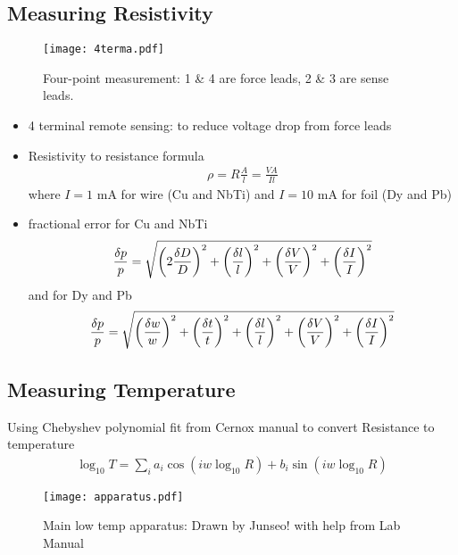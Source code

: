 \documentclass{article}
\begin{document}
\subsection{Measuring Resistivity}
\begin{figure}[ht]
    \centering
    \texttt{[image: 4terma.pdf]}
    \caption{Four-point measurement: 1 \& 4 are force leads, 2 \& 3 are sense leads.}
    \label{fig:thermometer}
\end{figure}
\begin{itemize}
    \item 4 terminal remote sensing: to reduce voltage drop from force leads
    \item Resistivity to resistance formula
    \begin{align*}
        \rho = R \frac{A}{l} = \frac{VA}{Il}
    \end{align*}
    where $I = 1$ mA for wire (Cu and NbTi) and $I = 10$ mA for foil (Dy and Pb)
    \item fractional error for Cu and NbTi
    \begin{align*}
        \frac{\delta p}{p} = \sqrt{\qt(2 \frac{\delta D}{D})^2 + \qt(\frac{\delta l}{l})^2 + \qt(\frac{\delta V}{V})^2 + \qt(\frac{\delta I}{I})^2}
    \end{align*}
    and for Dy and Pb
    \begin{align*}
        \frac{\delta p}{p} = \sqrt{\qt(\frac{\delta w}{w})^2 + \qt(\frac{\delta t}{t})^2 + \qt(\frac{\delta l}{l})^2 + \qt(\frac{\delta V}{V})^2 + \qt(\frac{\delta I}{I})^2}
    \end{align*}
\end{itemize}

\subsection{Measuring Temperature}
Using Chebyshev polynomial fit from Cernox manual to convert Resistance to temperature
\begin{align*}
    \log_{10} T = \sum_{i} a_i \cos(iw \log_{10} R) + b_i \sin(iw \log_{10} R)
\end{align*}

\newpage 
\begin{figure}[ht]
    \centering
    \texttt{[image: apparatus.pdf]}
    \caption{Main low temp apparatus: Drawn by Junseo! with help from Lab Manual}
    \label{fig:apparatus}
\end{figure}
\end{document}
